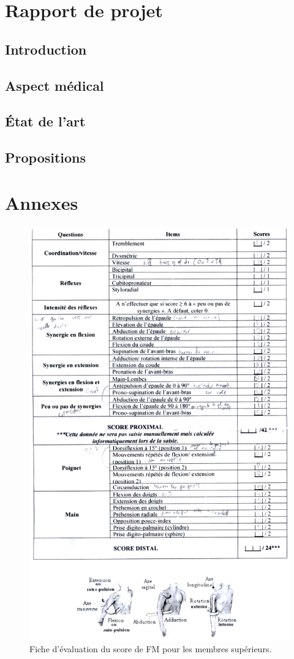 \documentclass[french,12pt]{report}
\begin{document}
\part{Rapport de projet}

\newpage



\chapter{Introduction}
	
	\pagebreak

\chapter{Aspect médical}\label{lapeyronie}
  
  \pagebreak
		
\chapter{État de l'art}
  
  
  \pagebreak
  
\chapter{Propositions}
  
  
  
  
  
  \pagebreak
		
  
    
\part{Annexes}
	\begin{figure}[h!]
	\centering
  \includegraphics[width=0.6\linewidth]{images/evaluation_FM}
  \caption{Fiche d'évaluation du score de FM pour les membres supérieurs.}
  \label{evaluation_FM}
  \end{figure}
\end{document}
